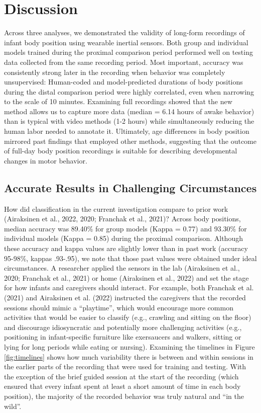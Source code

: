 \documentclass[
  man]{apa6}
\begin{document}
\hypertarget{discussion}{%
\section{Discussion}\label{discussion}}

Across three analyses, we demonstrated the validity of long-form recordings of infant body position using wearable inertial sensors. Both group and individual models trained during the proximal comparison period performed well on testing data collected from the same recording period. Most important, accuracy was consistently strong later in the recording when behavior was completely unsupervised: Human-coded and model-predicted durations of body positions during the distal comparison period were highly correlated, even when narrowing to the scale of 10 minutes. Examining full recordings showed that the new method allows us to capture more data (median = 6.14 hours of awake behavior) than is typical with video methods (1-2 hours) while simultaneously reducing the human labor needed to annotate it. Ultimately, age differences in body position mirrored past findings that employed other methods, suggesting that the outcome of full-day body position recordings is suitable for describing developmental changes in motor behavior.

\hypertarget{accurate-results-in-challenging-circumstances}{%
\subsection{Accurate Results in Challenging Circumstances}\label{accurate-results-in-challenging-circumstances}}

How did classification in the current investigation compare to prior work (Airaksinen et al., 2022, 2020; Franchak et al., 2021)? Across body positions, median accuracy was 89.40\% for group models (Kappa = 0.77) and 93.30\% for individual models (Kappa = 0.85) during the proximal comparison. Although these accuracy and kappa values are slightly lower than in past work (accuracy 95-98\%, kappas .93-.95), we note that those past values were obtained under ideal circumstances. A researcher applied the sensors in the lab (Airaksinen et al., 2020; Franchak et al., 2021) or home (Airaksinen et al., 2022) and set the stage for how infants and caregivers should interact. For example, both Franchak et al. (2021) and Airaksinen et al. (2022) instructed the caregivers that the recorded sessions should mimic a ``playtime'', which would encourage more common activities that would be easier to classify (e.g., crawling and sitting on the floor) and discourage idiosyncratic and potentially more challenging activities (e.g., positioning in infant-specific furniture like exersaucers and walkers, sitting or lying for long periods while eating or nursing). Examining the timelines in Figure \ref{fig:timelines} shows how much variability there is between and within sessions in the earlier parts of the recording that were used for training and testing. With the exception of the brief guided session at the start of the recording (which ensured that every infant spent at least a short amount of time in each body position), the majority of the recorded behavior was truly natural and ``in the wild''.
\end{document}
